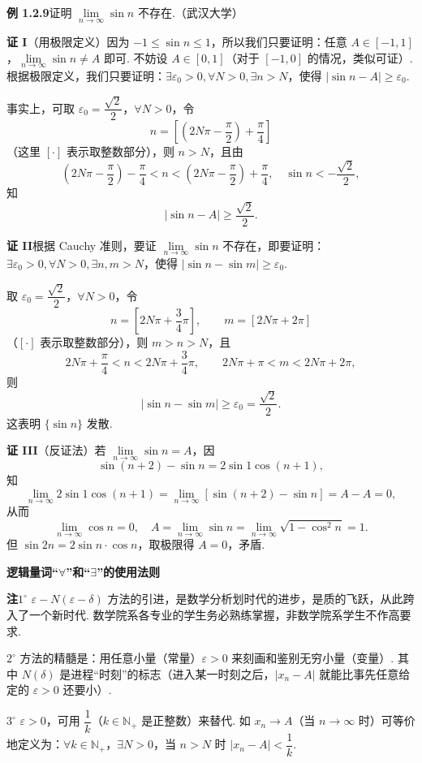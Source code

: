 \documentclass[UTF8,12pt,a4paper,fontset=fandol]{ctexart}
\begin{document}
\noindent\textbf{例 1.2.9}\quad 证明 $\lim\limits_{n\to\infty}\sin n$ 不存在.（武汉大学）

\noindent\textbf{证 I}\quad （用极限定义）因为 $-1\le\sin n\le1$，所以我们只要证明：任意 $A\in[-1,1]$，$\lim\limits_{n\to\infty}\sin n\ne A$ 即可. 不妨设 $A\in[0,1]$（对于 $[-1,0]$ 的情况，类似可证）. 根据极限定义，我们只要证明：$\exists\varepsilon_0>0,\forall N>0,\exists n>N$，使得 $|\sin n-A|\ge\varepsilon_0$.

事实上，可取 $\varepsilon_0=\dfrac{\sqrt2}{2}$，$\forall N>0$，令
\[
  n=\left[\left(2N\pi-\frac\pi2\right)+\frac\pi4\right]
\]
（这里 $[\cdot]$ 表示取整数部分），则 $n>N$，且由
\[
  \left(2N\pi-\frac\pi2\right)-\frac\pi4<n<\left(2N\pi-\frac\pi2\right)+\frac\pi4,\quad
  \sin n<-\frac{\sqrt2}{2},
\]
知
\[
  |\sin n-A|\ge\frac{\sqrt2}{2}.
\]

\noindent\textbf{证 II}\quad 根据 Cauchy 准则，要证 $\lim\limits_{n\to\infty}\sin n$ 不存在，即要证明：$\exists\varepsilon_0>0,\forall N>0,\exists n,m>N$，使得 $|\sin n-\sin m|\ge\varepsilon_0$.

取 $\varepsilon_0=\dfrac{\sqrt2}{2}$，$\forall N>0$，令
\[
  n=\left[2N\pi+\frac34\pi\right],\qquad m=[2N\pi+2\pi]
\]
（$[\cdot]$ 表示取整数部分），则 $m>n>N$，且
\[
  2N\pi+\frac\pi4<n<2N\pi+\frac34\pi,\qquad
  2N\pi+\pi<m<2N\pi+2\pi,
\]
则
\[
  |\sin n-\sin m|\ge \varepsilon_0=\frac{\sqrt2}{2}.
\]
这表明 $\{\sin n\}$ 发散.

\noindent\textbf{证 III}\quad （反证法）若 $\lim\limits_{n\to\infty}\sin n=A$，因
\[
  \sin(n+2)-\sin n=2\sin1\cos(n+1),
\]
知
\[
  \lim_{n\to\infty}2\sin1\cos(n+1)=\lim_{n\to\infty}[\sin(n+2)-\sin n]=A-A=0,
\]
从而
\[
  \lim_{n\to\infty}\cos n=0,\quad
  A=\lim_{n\to\infty}\sin n=\lim_{n\to\infty}\sqrt{1-\cos^2n}=1.
\]
但 $\sin2n=2\sin n\cdot\cos n$，取极限得 $A=0$，矛盾.

\noindent\textbf{逻辑量词“$\forall$”和“$\exists$”的使用法则}

\noindent\textbf{注}\quad $1^\circ$ $\varepsilon-N(\varepsilon-\delta)$ 方法的引进，是数学分析划时代的进步，是质的飞跃，从此跨入了一个新时代. 数学院系各专业的学生务必熟练掌握，非数学院系学生不作高要求.

$2^\circ$ 方法的精髓是：用任意小量（常量）$\varepsilon>0$ 来刻画和鉴别无穷小量（变量）. 其中 $N(\delta)$ 是进程“时刻”的标志（进入某一时刻之后，$|x_n-A|$ 就能比事先任意给定的 $\varepsilon>0$ 还要小）.

$3^\circ$ $\varepsilon>0$，可用 $\dfrac1k$（$k\in\mathbb{N}_+$ 是正整数）来替代. 如 $x_n\to A$（当 $n\to\infty$ 时）可等价地定义为：$\forall k\in\mathbb{N}_+$，$\exists N>0$，当 $n>N$ 时 $|x_n-A|<\dfrac1k$.
\end{document}

